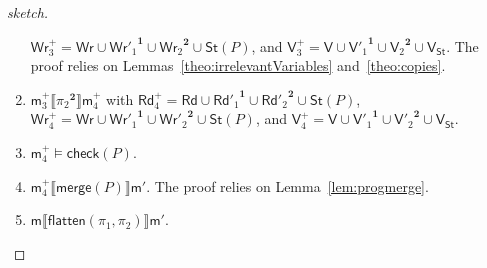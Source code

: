 \documentclass{llncs}
\newcommand{\progOkChange}{\mathsf{check}}
\newcommand{\progmerge}{\mathsf{merge}}
\newcommand{\progFlatten}{\mathsf{flatten}}
\newcommand{\cp}[2]{{#2}^\mathbf{#1}}
\newcommand{\modl}{\mathsf m}
\newcommand{\readset}{\mathsf{Rd}}
\newcommand{\valuset}{\mathsf{V}}
\newcommand{\writeset}{\mathsf{Wr}}
\newcommand{\storeset}{\mathsf{St}}
\newcommand{\intPgm}[1]{\llbracket #1 \rrbracket}
\begin{document}
\begin{proof}[sketch]
\begin{enumerate}
        $\writeset^+_3 = \writeset \cup \cp 1 {\writeset'_1} \cup \cp 2 {\writeset_2} \cup \storeset(P)$, and
        $\valuset^+_3 = \valuset \cup \cp 1 {\valuset'_1} \cup \cp 2 {\valuset_2} \cup \valuset_{\storeset}$.
        The proof relies on Lemmas~\ref{theo:irrelevantVariables} and~\ref{theo:copies}.
  \item\label{pllequivalence:ltr:pi2}
        $\modl^+_3 \intPgm{\cp 2 {\pi_2}} \modl^+_4$ with
        $\readset^+_4 = \readset \cup \cp 1 {\readset'_1} \cup \cp 2 {\readset'_2} \cup \storeset(P)$,
        $\writeset^+_4 = \writeset \cup \cp 1 {\writeset'_1} \cup \cp 2 {\writeset'_2} \cup \storeset(P)$, and
        $\valuset^+_4 = \valuset \cup \cp 1 {\valuset'_1} \cup \cp 2 {\valuset'_2} \cup \valuset_{\storeset}$.
  \item\label{pllequivalence:ltr:check}
        $\modl^+_4 \models \progOkChange(P)$.
  \item\label{pllequivalence:ltr:merge}
        $\modl^+_4 \intPgm{\progmerge(P)} \modl'$.
        The proof relies on Lemma~\ref{lem:progmerge}.
  \item $\modl \intPgm{\progFlatten(\pi_1, \pi_2)} \modl'$.
\end{enumerate}


\end{proof}
\end{document}
